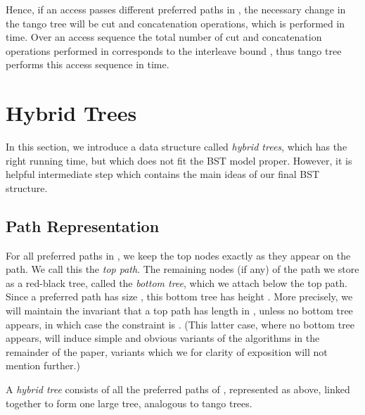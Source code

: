 \documentclass[letterpaper,11pt]{article}
\newcommand{\toppath}{top path}
\newcommand{\bottomtree}{bottom tree}
\begin{document}
Hence, if an access passes  different preferred paths in , the
necessary change in the tango tree will be  cut and concatenation
operations, which is performed in  time. Over an access
sequence  the total number of cut and concatenation operations performed
in  corresponds to the interleave bound , thus tango
tree performs this access sequence in  time.

\section{Hybrid Trees}
\label{hybrid}

In this section, we introduce a data structure called \emph{hybrid trees},
which has the right running time, but which does not fit the BST model
proper. However, it is helpful intermediate step which contains the main
ideas of our final BST structure.

\subsection{Path Representation}

For all preferred paths in , we keep the top  nodes
exactly as they appear on the path. We call this the \emph{\toppath{}}. The
remaining nodes (if any) of the path we store as a red-black tree, called
the \emph{\bottomtree}, which we attach below the \toppath{}. Since a
preferred path has size , this \bottomtree{} has height .
More precisely, we will maintain the invariant that a \toppath{} has length
in , unless no \bottomtree{} appears, in
which case the constraint is  . (This latter
case, where no \bottomtree{} appears, will induce simple and obvious
variants of the algorithms in the remainder of the paper, variants which we
for clarity of exposition will not mention further.)

A \emph{hybrid tree} consists of all the preferred paths of ,
represented as above, linked together to form one large tree, analogous
to tango trees.
\end{document}
